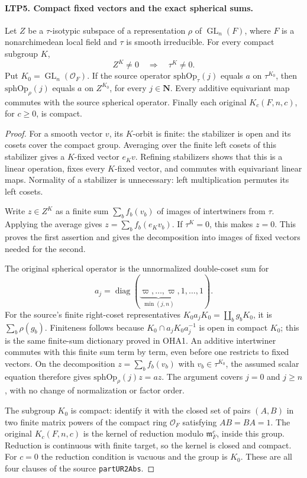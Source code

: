 \documentclass[11pt,a4paper]{article}
\numberwithin{equation}{section}
\theoremstyle{remark}\newtheorem{remark}[theorem]{Remark}
\begin{document}
\paragraph{LTP5. Compact fixed vectors and the exact spherical sums.}
\label{claim:LTP5}
Let \(Z\) be a \(\tau\)-isotypic subspace of a representation
\(\rho\) of \(\operatorname{GL}_n(F)\), where \(F\) is a
nonarchimedean local field and \(\tau\) is smooth irreducible.
For every compact subgroup \(K\),
\[
               Z^K\ne0\quad\Longrightarrow\quad\tau^K\ne0 .
\]
Put \(K_0=\operatorname{GL}_n(\mathcal O_F)\).  If the source
operator \(\mathrm{sphOp}_{\tau}(j)\) equals \(a\) on \(\tau^{K_0}\),
then \(\mathrm{sphOp}_{\rho}(j)\) equals \(a\) on \(Z^{K_0}\),
for every \(j\in\mathbf N\).  Every additive equivariant map
commutes with the source spherical operator.  Finally each original
\(K_c(F,n,c)\), for \(c\ge0\), is compact.
\begin{proof}
For a smooth vector \(v\), its \(K\)-orbit is finite: the stabilizer
is open and its cosets cover the compact group.  Averaging over the
finite left cosets of this stabilizer gives a \(K\)-fixed vector
\(e_Kv\).  Refining stabilizers shows that this is a linear operation,
fixes every \(K\)-fixed vector, and commutes with equivariant linear
maps.  Normality of a stabilizer is unnecessary: left multiplication
permutes its left cosets.

Write \(z\in Z^K\) as a finite sum \(\sum_b f_b(v_b)\) of images of
intertwiners from \(\tau\).  Applying the average gives
\(z=\sum_bf_b(e_Kv_b)\).  If \(\tau^K=0\), this makes \(z=0\).
This proves the first assertion and gives the decomposition into
images of fixed vectors needed for the second.

The original spherical operator is the unnormalized double-coset
sum for
\[
 a_j=\operatorname{diag}
       (\underbrace{\varpi,\ldots,\varpi}_{\min(j,n)},
        1,\ldots,1).
\]
For the source's finite right-coset representatives
\(K_0a_jK_0=\coprod_b g_bK_0\), it is
\(\sum_b\rho(g_b)\).  Finiteness follows because
\(K_0\cap a_jK_0a_j^{-1}\) is open in compact \(K_0\);
this is the same finite-sum dictionary proved in OHA1.
An additive intertwiner commutes with this finite sum term by
term, even before one restricts to fixed vectors.  On the
decomposition \(z=\sum_bf_b(v_b)\) with \(v_b\in\tau^{K_0}\),
the assumed scalar equation therefore gives
\(\mathrm{sphOp}_\rho(j)z=az\).
The argument covers \(j=0\) and \(j\ge n\), with no change of
normalization or factor order.

The subgroup \(K_0\) is compact: identify it with the closed set of
pairs \((A,B)\) in two finite matrix powers of the compact ring
\(\mathcal O_F\) satisfying \(AB=BA=1\).
The original \(K_c(F,n,c)\) is the kernel of reduction modulo
\(\mathfrak m_F^c\), inside this group.  Reduction is continuous
with finite target, so the kernel is closed and compact.
For \(c=0\) the reduction condition is vacuous and the group is
\(K_0\).  These are all four clauses of the source
\texttt{part\allowbreak UR2Abs}.
\end{proof}
\end{document}
